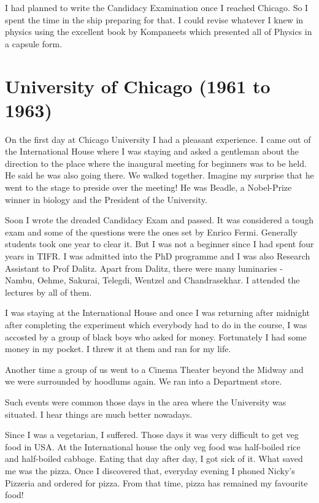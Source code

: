 I had planned to write the Candidacy Examination once I reached Chicago. 
So I spent the time in the ship preparing for that. I could revise 
whatever I knew in physics using the exce\-llent book by Kompaneets which 
presented all of Physics in a capsule form.
\vspace{-\topsep}
\section*{University of Chicago (1961 to 1963)}
\vskip -11pt
On the first day at Chicago University I had a pleasant experience. I 
came out of the International House where I was staying and asked a 
gentleman about the direction to the place where the inaugural meeting 
for beginners was to be held. He said he was also going there. We walked 
together. Imagine my surprise that he went to the stage to preside over 
the meeting! He was Beadle, a Nobel-Prize winner in biology and the 
President of the University.
    
Soon I wrote the dreaded Candidacy Exam and passed. It was considered a 
tough exam and some of the questions were the ones set by Enrico Fermi. 
Generally students took one year to clear it. But I was not a beginner 
since I had spent four years in TIFR. I was admitted into the PhD 
programme and I was also Research Assistant to Prof Dalitz. Apart from 
Dalitz, there were many luminaries - Nambu, Oehme, Sakurai, Telegdi, 
Wentzel and Chandrasekhar. I attended the lectures by all of them.

I was staying at the International House and once I was returning after 
midnight after completing the experiment which everybody had to do in 
the course, I was accosted by a group of black boys who asked for money. 
Fortunately I had some money in my pocket. I threw it at them and ran 
for my life.

Another time a group of us went to a Cinema Theater beyond the Midway 
and we were surrounded by hoodlums again. We ran into a Department 
store.


Such events were common those days in the area where the University was 
situated. I hear things are much better nowadays.

Since I was a vegetarian, I suffered. Those days it was very difficult 
to get veg food in USA. At the International house the only veg food was 
half-boiled rice and half-boiled cabbage. Ea\-ting that day after day, I 
got sick of it. What saved me was the pizza. Once I discovered that, 
everyday evening I phoned Nicky's Pizzeria and ordered for pizza. From 
that time, pizza has remained my favourite food!
 
